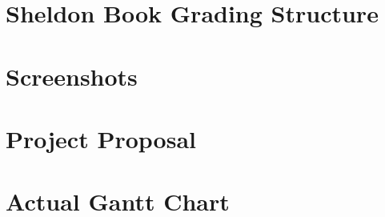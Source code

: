 \begin{appendices}

\chapter{Sheldon Book Grading Structure}



















\chapter{Screenshots}

\chapter{Project Proposal}

\chapter{Actual Gantt Chart}

\end{appendices}
